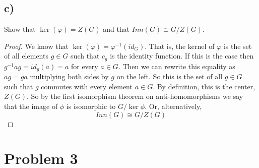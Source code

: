 \documentclass{article}
\theoremstyle{definition}
\begin{document}
    \subsection*{c)}
        \begin{mdframed}
            Show that $\ker(\varphi) = Z(G)$ and that $Inn(G) \cong G / Z(G)$.
        \end{mdframed}
        \begin{proof}
            We know that $\ker(\varphi) = \varphi^{-1}(id_G)$. That is, the kernel of $\varphi$ is 
            the set of all elements $g \in G$ such that $c_g$ is the identity function. If this is 
            the case then $g^{-1}a g = id_g(a) = a$ for every $a \in G$. Then we can rewrite this equality 
            as $ag = ga$ multiplying both sides by $g$ on the left. So this is the set of all $g \in G$ such that 
            $g$ commutes with every element $a \in G$. By definition, this is the center, $Z(G)$.
            So by the first isomorphism theorem on anti-homomorphisms we say that the image of $\phi$ is isomorphic to $G / \ker \phi$.
            Or, alternatively,
            \[
                Inn(G) \cong G / Z(G)
            \]
        \end{proof}
\section*{Problem 3}
\end{document}
